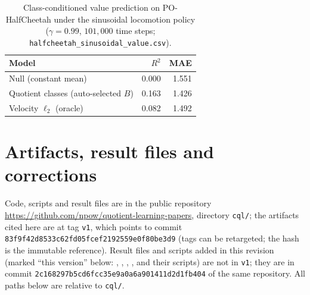\documentclass[10pt]{article}
\begin{document}



\begin{table}[h]
\centering
\small
\begin{tabular}{lrr}
\toprule
Model & $R^2$ & MAE \\
\midrule
Null (constant mean) & 0.000 & 1.551 \\
Quotient classes (auto-selected $B$) & 0.163 & 1.426 \\
Velocity $\ell_2$ (oracle) & 0.082 & 1.492 \\
\bottomrule
\end{tabular}
\caption{Class-conditioned value prediction on PO-HalfCheetah under the
  sinusoidal locomotion policy ($\gamma=0.99$, $101{,}000$ time steps;
  \texttt{halfcheetah\_sinusoidal\_value.csv}).}
\label{tab:sinval}
\end{table}
\section{Artifacts, result files and corrections}
\label{sec:artifacts}

Code, scripts and result files are in the public repository
\url{https://github.com/npow/quotient-learning-papers}, directory \texttt{cql/};
the artifacts cited here are at tag \texttt{v1}, which points to commit
\texttt{83f9f42d8533c62fd05fcef2192559e0f80be3d9} (tags can be retargeted; the
hash is the immutable reference).  Result files and scripts added in this
revision (marked ``this version'' below: ,
, ,
, 
and their scripts) are not in \texttt{v1}; they are in commit
\texttt{2c168297b5cd6fcc35e9a0a6a901411d2d1fb404} of the same repository.  All paths below are relative to
\texttt{cql/}.
\end{document}
